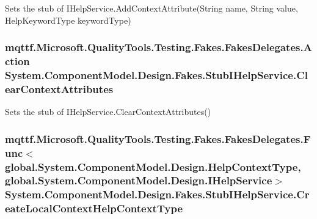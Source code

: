 Sets the stub of I\-Help\-Service.\-Add\-Context\-Attribute(\-String name, String value, Help\-Keyword\-Type keyword\-Type)

\hypertarget{class_system_1_1_component_model_1_1_design_1_1_fakes_1_1_stub_i_help_service_aeaca689b19d8fefd497a63800169ace2}{
\subsubsection[{Clear\-Context\-Attributes}]{\setlength{\rightskip}{0pt plus 5cm}mqttf.\-Microsoft.\-Quality\-Tools.\-Testing.\-Fakes.\-Fakes\-Delegates.\-Action System.\-Component\-Model.\-Design.\-Fakes.\-Stub\-I\-Help\-Service.\-Clear\-Context\-Attributes}}\label{class_system_1_1_component_model_1_1_design_1_1_fakes_1_1_stub_i_help_service_aeaca689b19d8fefd497a63800169ace2}


Sets the stub of I\-Help\-Service.\-Clear\-Context\-Attributes()

\hypertarget{class_system_1_1_component_model_1_1_design_1_1_fakes_1_1_stub_i_help_service_a14eee17473f15148a46d2ebca5de96c0}{
\subsubsection[{Create\-Local\-Context\-Help\-Context\-Type}]{\setlength{\rightskip}{0pt plus 5cm}mqttf.\-Microsoft.\-Quality\-Tools.\-Testing.\-Fakes.\-Fakes\-Delegates.\-Func$<$global.\-System.\-Component\-Model.\-Design.\-Help\-Context\-Type, global.\-System.\-Component\-Model.\-Design.\-I\-Help\-Service$>$ System.\-Component\-Model.\-Design.\-Fakes.\-Stub\-I\-Help\-Service.\-Create\-Local\-Context\-Help\-Context\-Type}}\label{class_system_1_1_component_model_1_1_design_1_1_fakes_1_1_stub_i_help_service_a14eee17473f15148a46d2ebca5de96c0}


